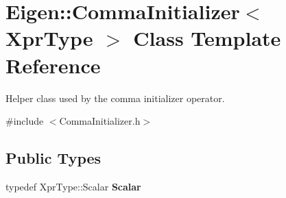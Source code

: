\hypertarget{struct_eigen_1_1_comma_initializer}{}\section{Eigen\+::Comma\+Initializer$<$ Xpr\+Type $>$ Class Template Reference}
\label{struct_eigen_1_1_comma_initializer}


Helper class used by the comma initializer operator.  




{\ttfamily \#include $<$Comma\+Initializer.\+h$>$}

\subsection*{Public Types}
\begin{DoxyCompactItemize}
\item 
\mbox{\label{struct_eigen_1_1_comma_initializer_a0fb578ef5537c458150ea8bb7eae63d7}} 
typedef Xpr\+Type\+::\+Scalar {\bfseries Scalar}
\end{DoxyCompactItemize}
